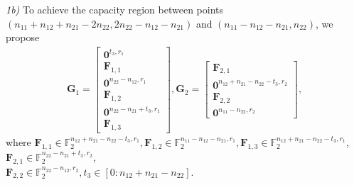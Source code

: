 \documentclass[12pt, draftclsnofoot, onecolumn]{IEEEtran}
\theoremstyle{definition}
\begin{document}




\emph{1b)} To achieve the capacity region between points $(n_{11}+n_{12}+n_{21}-2n_{22},2n_{22} - n_{12}- n_{21})$ and $(n_{11}-n_{12}-n_{21},n_{22})$, we propose
\begin{align}
\boldsymbol{G}_1 = \begin{bmatrix}
\boldsymbol{0}^{t_3,r_1} \\
\boldsymbol{F}_{1,1}\\
\boldsymbol{0}^{n_{22} - n_{12},r_1} \\
\boldsymbol{F}_{1,2}\\
\boldsymbol{0}^{n_{22}-n_{21}+t_3,r_1}\\
\boldsymbol{F}_{1,3}
\end{bmatrix},\boldsymbol{G}_2 = \begin{bmatrix}
\boldsymbol{F}_{2,1}\\
\boldsymbol{0}^{n_{12} +n_{21}- n_{22}-t_3,r_2} \\
\boldsymbol{F}_{2,2}\\
\boldsymbol{0}^{n_{11}-n_{22},r_2}
\end{bmatrix},
\end{align}
where $\boldsymbol{F}_{1,1}\in\mathbb{F}_2^{n_{12}+n_{21}-n_{22}-t_3,r_1},\boldsymbol{F}_{1,2}\in\mathbb{F}_2^{n_{11} -n_{12}-n_{21} ,r_1},\boldsymbol{F}_{1,3}\in\mathbb{F}_2^{n_{12} +n_{21}-n_{22}-t_3,r_1}$, $\boldsymbol{F}_{2,1}\in\mathbb{F}_2^{n_{22} - n_{21}+t_3,r_2}$, \\$\boldsymbol{F}_{2,2}\in\mathbb{F}_2^{n_{22} - n_{12},r_2},t_3 \in[0:n_{12} + n_{21} - n_{22} ]$.
\end{document}
